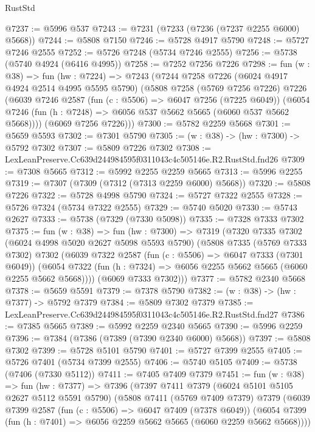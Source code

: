 \begin{lexlean}{RustStd}
\begin{coremodule}
@7237 := @5996 @537
@7243 := @7231 (@7233 (@7236 (@7237 @2255 @6000) @5668))
@7244 := @5808 @7150
@7246 := @5728 @4917 @5790
@7248 := @5727 @7246 @2555
@7252 := @5726 @7248 (@5734 @7246 @2555)
@7256 := @5738 (@5740 @4924 (@6416 @4995))
@7258 := @7252 @7256 @7226
@7298 := fun (w : @38) =>
  fun (hw : @7224) =>
  @7243
    (@7244
      @7258
      @7226
      (@6024 @4917 @4924 @2514 @4995 @5595 @5790)
      (@5808
        @7258
        (@5769 @7256 @7226)
        @7226
        (@6039
          @7246
          @2587
          (fun (c : @5506) => @6047 @7256 (@7225 @6049))
          (@6054 @7246 (fun (h : @7248) => @6056 @537 @5662 @5665 (@6060 @537 @5662 @5668))))
        (@6069 @7256 @7226)))
@7300 := @5782 @2259 @5668
@7301 := @5659 @5593
@7302 := @7301 @5790
@7305 := (w : @38) -> (hw : @7300) -> @5792 @7302
@7307 := @5809 @7226 @7302
@7308 := LexLeanPreserve.Cc639d244984595f0311043c4c505146e.R2.RustStd.fnd26
@7309 := @7308 @5665
@7312 := @5992 @2255 @2259 @5665
@7313 := @5996 @2255
@7319 := @7307 (@7309 (@7312 (@7313 @2259 @6000) @5668))
@7320 := @5808 @7226
@7322 := @5728 @4998 @5790
@7324 := @5727 @7322 @2555
@7328 := @5726 @7324 (@5734 @7322 @2555)
@7329 := @5740 @5020
@7330 := @5743 @2627
@7333 := @5738 (@7329 (@7330 @5098))
@7335 := @7328 @7333 @7302
@7375 := fun (w : @38) =>
  fun (hw : @7300) =>
  @7319
    (@7320
      @7335
      @7302
      (@6024 @4998 @5020 @2627 @5098 @5593 @5790)
      (@5808
        @7335
        (@5769 @7333 @7302)
        @7302
        (@6039
          @7322
          @2587
          (fun (c : @5506) => @6047 @7333 (@7301 @6049))
          (@6054 @7322 (fun (h : @7324) => @6056 @2255 @5662 @5665 (@6060 @2255 @5662 @5668))))
        (@6069 @7333 @7302)))
@7377 := @5782 @2340 @5668
@7378 := @5659 @5591
@7379 := @7378 @5790
@7382 := (w : @38) -> (hw : @7377) -> @5792 @7379
@7384 := @5809 @7302 @7379
@7385 := LexLeanPreserve.Cc639d244984595f0311043c4c505146e.R2.RustStd.fnd27
@7386 := @7385 @5665
@7389 := @5992 @2259 @2340 @5665
@7390 := @5996 @2259
@7396 := @7384 (@7386 (@7389 (@7390 @2340 @6000) @5668))
@7397 := @5808 @7302
@7399 := @5728 @5101 @5790
@7401 := @5727 @7399 @2555
@7405 := @5726 @7401 (@5734 @7399 @2555)
@7406 := @5740 @5105
@7409 := @5738 (@7406 (@7330 @5112))
@7411 := @7405 @7409 @7379
@7451 := fun (w : @38) =>
  fun (hw : @7377) =>
  @7396
    (@7397
      @7411
      @7379
      (@6024 @5101 @5105 @2627 @5112 @5591 @5790)
      (@5808
        @7411
        (@5769 @7409 @7379)
        @7379
        (@6039
          @7399
          @2587
          (fun (c : @5506) => @6047 @7409 (@7378 @6049))
          (@6054 @7399 (fun (h : @7401) => @6056 @2259 @5662 @5665 (@6060 @2259 @5662 @5668))))

\end{coremodule}
\end{lexlean}
